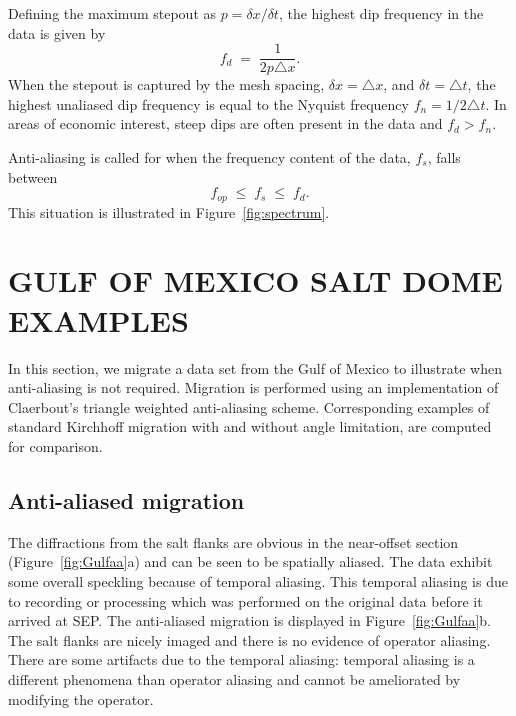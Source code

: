 Defining the maximum stepout as $p = \delta x /\delta t$, the
highest dip frequency in the data is given by 
\begin{equation}
f_d \; = \; \frac{1}{2 p \triangle x}.
\end{equation}
When the stepout is captured by the mesh 
spacing, $\delta x = \triangle x$, and $\delta t = \triangle t$, the
highest unaliased dip frequency is equal to the 
Nyquist frequency $f_n = 1/2\triangle t$. In areas of
economic interest, steep dips are often
present in the data and $f_d > f_n$.

Anti-aliasing is called for when the frequency content of the data, $f_s$, 
falls between 
\begin{equation}
\label{eqn:crit}
f_{op} \; \leq \; f_s \; \leq \; f_d.
\end{equation}
This situation is illustrated in Figure~\ref{fig:spectrum}.


\section{GULF OF MEXICO SALT DOME EXAMPLES}
In this section, we migrate a data set from the Gulf of Mexico to illustrate
when anti-aliasing is not required.  Migration is performed using
an implementation of Claerbout's triangle weighted anti-aliasing 
scheme.  Corresponding examples of standard Kirchhoff migration 
with and without angle limitation, are computed for
comparison.

\subsection{Anti-aliased migration}
The diffractions from the salt flanks are 
obvious in the near-offset section (Figure~\ref{fig:Gulfaa}a) and can be seen 
to be spatially aliased.  The data exhibit some overall 
speckling because of temporal aliasing. This temporal aliasing is due to 
recording or processing which was performed on the original data before
it arrived at SEP.
The anti-aliased migration is displayed in Figure~\ref{fig:Gulfaa}b. The 
salt flanks are nicely imaged and there is no evidence of operator aliasing.
There are some artifacts due to the temporal aliasing:
temporal aliasing is a different phenomena than operator aliasing and
cannot be ameliorated by modifying the operator.

